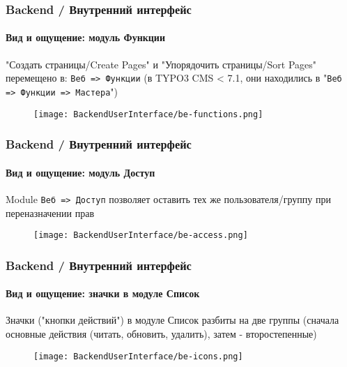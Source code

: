 \begin{frame}[fragile]
	\frametitle{Backend / Внутренний интерфейс}
	\framesubtitle{Вид и ощущение: модуль Функции}

	"Создать страницы/Create Pages" и "Упорядочить страницы/Sort Pages" перемещено в: \texttt{Веб => Функции}\newline
	\smaller (в TYPO3 CMS < 7.1, они находились в "\texttt{Веб => Функции => Мастера}")

	\begin{figure}
		\texttt{[image: BackendUserInterface/be-functions.png]}
	\end{figure}


\end{frame}


\begin{frame}[fragile]
	\frametitle{Backend / Внутренний интерфейс}
	\framesubtitle{Вид и ощущение: модуль Доступ}

	Module \texttt{Веб => Доступ} позволяет оставить тех же пользователя/группу\newline
	при переназначении прав

	\begin{figure}
		\texttt{[image: BackendUserInterface/be-access.png]}
	\end{figure}

\end{frame}


\begin{frame}[fragile]
	\frametitle{Backend / Внутренний интерфейс}
	\framesubtitle{Вид и ощущение: значки в модуле Список}

	Значки ("кнопки действий") в модуле Список разбиты на две группы\newline
	\smaller (сначала основные действия (читать, обновить, удалить), затем - второстепенные)

	\begin{figure}
		\texttt{[image: BackendUserInterface/be-icons.png]}
	\end{figure}

\end{frame}

